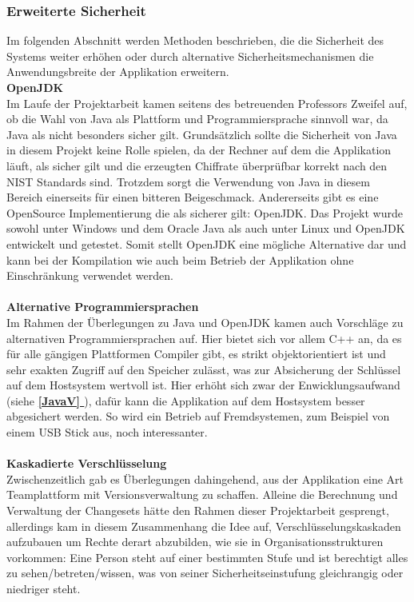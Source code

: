 \documentclass[13pt,a4paper,bibliography=totocnumbered,listof=totocnumbered]{scrartcl}
\newcommand*{\fullref}[1]{\textbf{\hyperref[{#1}]{\ref*{#1} \nameref*{#1}}}}
\begin{document}
\subsubsection{Erweiterte Sicherheit}
Im folgenden Abschnitt werden Methoden beschrieben, die die Sicherheit des Systems weiter erhöhen oder durch alternative Sicherheitsmechanismen die Anwendungsbreite der Applikation erweitern.
\\\textbf{OpenJDK}\\
Im Laufe der Projektarbeit kamen seitens des betreuenden Professors Zweifel auf, ob die Wahl von Java als Plattform und Programmiersprache sinnvoll war, da Java als nicht besonders sicher gilt. Grundsätzlich sollte die Sicherheit von Java in diesem Projekt keine Rolle spielen, da der Rechner auf dem die Applikation läuft, als sicher gilt und die erzeugten Chiffrate überprüfbar korrekt nach den NIST Standards sind. Trotzdem sorgt die Verwendung von Java in diesem Bereich einerseits für einen bitteren Beigeschmack. Andererseits gibt es eine OpenSource Implementierung die als sicherer gilt: OpenJDK. Das Projekt wurde sowohl unter Windows und dem Oracle Java als auch unter Linux und OpenJDK entwickelt und getestet. Somit stellt OpenJDK eine mögliche Alternative dar und kann bei der Kompilation wie auch beim Betrieb der Applikation ohne Einschränkung verwendet werden.\\
\\\textbf{Alternative Programmiersprachen}\\
Im Rahmen der Überlegungen zu Java und OpenJDK kamen auch Vorschläge zu alternativen Programmiersprachen auf. Hier bietet sich vor allem C++ an, da es für alle gängigen Plattformen Compiler gibt, es strikt objektorientiert ist und sehr exakten Zugriff auf den Speicher zulässt, was zur Absicherung der Schlüssel auf dem Hostsystem wertvoll ist. Hier erhöht sich zwar der Enwicklungsaufwand (siehe \fullref{JavaV}), dafür kann die Applikation auf dem Hostsystem besser abgesichert werden. So wird ein Betrieb auf Fremdsystemen, zum Beispiel von einem USB Stick aus, noch interessanter.\\
\\\textbf{Kaskadierte Verschlüsselung}\\
Zwischenzeitlich gab es Überlegungen dahingehend, aus der Applikation eine Art Teamplattform mit Versionsverwaltung zu schaffen. Alleine die Berechnung und Verwaltung der Changesets hätte den Rahmen dieser Projektarbeit gesprengt, allerdings kam in diesem Zusammenhang die Idee auf, Verschlüsselungskaskaden aufzubauen um Rechte derart abzubilden, wie sie in Organisationsstrukturen vorkommen: Eine Person steht auf einer bestimmten Stufe und ist berechtigt alles zu sehen/betreten/wissen, was von seiner Sicherheitseinstufung gleichrangig oder niedriger steht.
\end{document}
